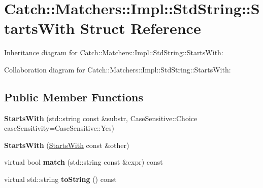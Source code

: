 \hypertarget{struct_catch_1_1_matchers_1_1_impl_1_1_std_string_1_1_starts_with}{}\section{Catch\+:\+:Matchers\+:\+:Impl\+:\+:Std\+String\+:\+:Starts\+With Struct Reference}
\label{struct_catch_1_1_matchers_1_1_impl_1_1_std_string_1_1_starts_with}


Inheritance diagram for Catch\+:\+:Matchers\+:\+:Impl\+:\+:Std\+String\+:\+:Starts\+With\+:


Collaboration diagram for Catch\+:\+:Matchers\+:\+:Impl\+:\+:Std\+String\+:\+:Starts\+With\+:
\subsection*{Public Member Functions}
\begin{DoxyCompactItemize}
\item 
\mbox{\label{struct_catch_1_1_matchers_1_1_impl_1_1_std_string_1_1_starts_with_a0db1bd8876219464ae60346c9525bcf6}} 
{\bfseries Starts\+With} (std\+::string const \&substr, Case\+Sensitive\+::\+Choice case\+Sensitivity=Case\+Sensitive\+::\+Yes)
\item 
\mbox{\label{struct_catch_1_1_matchers_1_1_impl_1_1_std_string_1_1_starts_with_a5526cb587632e7e46253d6f60ae01098}} 
{\bfseries Starts\+With} (\hyperlink{struct_catch_1_1_matchers_1_1_impl_1_1_std_string_1_1_starts_with}{Starts\+With} const \&other)
\item 
\mbox{\label{struct_catch_1_1_matchers_1_1_impl_1_1_std_string_1_1_starts_with_ab8f8d15e06d7ec13fee7d9ec4075dafa}} 
virtual bool {\bfseries match} (std\+::string const \&expr) const
\item 
\mbox{\label{struct_catch_1_1_matchers_1_1_impl_1_1_std_string_1_1_starts_with_a85a24e2ac23025edbe31cbf5bb755fb3}} 
virtual std\+::string {\bfseries to\+String} () const
\end{DoxyCompactItemize}

